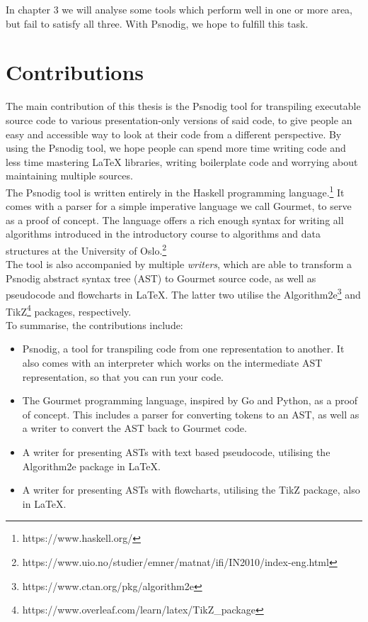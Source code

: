 In chapter 3 we will analyse some tools which perform well in one or more area, but fail to satisfy all three. With Psnodig, we hope to fulfill this task.

\section{Contributions}

The main contribution of this thesis is the Psnodig tool for transpiling executable source code to various presentation-only versions of said code, to give people an easy and accessible way to look at their code from a different perspective. By using the Psnodig tool, we hope people can spend more time writing code and less time mastering LaTeX libraries, writing boilerplate code and worrying about maintaining multiple sources. \hfill \\

The Psnodig tool is written entirely in the Haskell programming language.\footnote{https://www.haskell.org/} It comes with a parser for a simple imperative language we call Gourmet, to serve as a proof of concept. The language offers a rich enough syntax for writing all algorithms introduced in the introductory course to algorithms and data structures at the University of Oslo.\footnote{https://www.uio.no/studier/emner/matnat/ifi/IN2010/index-eng.html} \hfill \\

The tool is also accompanied by multiple \textit{writers}, which are able to transform a Psnodig abstract syntax tree (AST) to Gourmet source code, as well as pseudocode and flowcharts in LaTeX. The latter two utilise the Algorithm2e\footnote{https://www.ctan.org/pkg/algorithm2e} and TikZ\footnote{https://www.overleaf.com/learn/latex/TikZ\_package} packages, respectively. \hfill \\


To summarise, the contributions include:
\begin{itemize}
    \item Psnodig, a tool for transpiling code from one representation to another. It also comes with an interpreter which works on the intermediate AST representation, so that you can run your code.
    \item The Gourmet programming language, inspired by Go and Python, as a proof of concept. This includes a parser for converting tokens to an AST, as well as a writer to convert the AST back to Gourmet code.
    \item A writer for presenting ASTs with text based pseudocode, utilising the Algorithm2e package in LaTeX.
    \item A writer for presenting ASTs with flowcharts, utilising the TikZ package, also in LaTeX.
\end{itemize}

